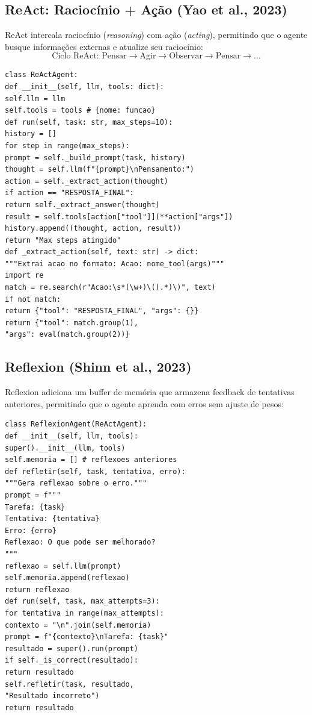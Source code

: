 \subsection{ReAct: Raciocínio + Ação (Yao et al., 2023)}
ReAct \cite{yao2023react} intercala raciocínio (\textit{reasoning}) com
ação (\textit{acting}), permitindo que o agente busque informações externas
e atualize seu raciocínio:
\[\text{Ciclo ReAct: } \text{Pensar} \to \text{Agir} \to \text{Observar} \to \text{Pensar} \to \ldots
\]
\begin{lstlisting}[style=pythonstyle]
class ReActAgent:
def __init__(self, llm, tools: dict):
self.llm = llm
self.tools = tools # {nome: funcao}
def run(self, task: str, max_steps=10):
history = []
for step in range(max_steps):
prompt = self._build_prompt(task, history)
thought = self.llm(f"{prompt}\nPensamento:")
action = self._extract_action(thought)
if action == "RESPOSTA_FINAL":
return self._extract_answer(thought)
result = self.tools[action["tool"]](**action["args"])
history.append((thought, action, result))
return "Max steps atingido"
def _extract_action(self, text: str) -> dict:
"""Extrai acao no formato: Acao: nome_tool(args)"""
import re
match = re.search(r"Acao:\s*(\w+)\((.*)\)", text)
if not match:
return {"tool": "RESPOSTA_FINAL", "args": {}}
return {"tool": match.group(1),
"args": eval(match.group(2))}
\end{lstlisting}
\subsection{Reflexion (Shinn et al., 2023)}
Reflexion \cite{shinn2023reflexion} adiciona um buffer de memória que
armazena feedback de tentativas anteriores, permitindo que o agente aprenda
com erros sem ajuste de pesos:
\begin{lstlisting}[style=pythonstyle]
class ReflexionAgent(ReActAgent):
def __init__(self, llm, tools):
super().__init__(llm, tools)
self.memoria = [] # reflexoes anteriores
def refletir(self, task, tentativa, erro):
"""Gera reflexao sobre o erro."""
prompt = f"""
Tarefa: {task}
Tentativa: {tentativa}
Erro: {erro}
Reflexao: O que pode ser melhorado?
"""
reflexao = self.llm(prompt)
self.memoria.append(reflexao)
return reflexao
def run(self, task, max_attempts=3):
for tentativa in range(max_attempts):
contexto = "\n".join(self.memoria)
prompt = f"{contexto}\nTarefa: {task}"
resultado = super().run(prompt)
if self._is_correct(resultado):
return resultado
self.refletir(task, resultado,
"Resultado incorreto")
return resultado
\end{lstlisting}

